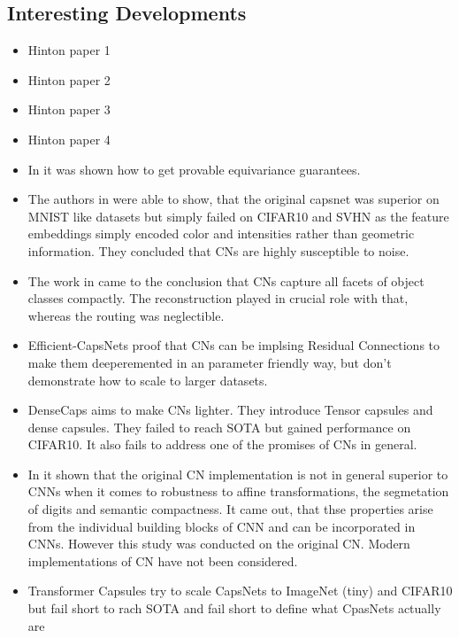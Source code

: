 \documentclass{article}
\begin{document}
\subsection{Interesting Developments}
\begin{itemize}
	\item \cite{icann/HintonKW11} Hinton paper 1
	\item \cite{nips/SabourFH17} Hinton paper 2
	\item \cite{iclr/HintonSF18} Hinton paper 3
	\item \cite{nips/KosiorekSTH19} Hinton paper 4
	\item In \cite{DBLP:conf/iclr/VenkataramanBS20} it was shown how to get provable equivariance guarantees.
	\item The authors in \cite{DBLP:journals/corr/Nair2021} were able to show, that the original capsnet \cite{DBLP:conf/nips/SabourFH17} was superior on MNIST like datasets but simply failed on CIFAR10 and SVHN as the feature embeddings simply encoded color and intensities rather than geometric information. They concluded that CNs are highly susceptible to noise.
	\item The work in \cite{DBLP:journals/corr/Arjun2020} came to the conclusion that CNs capture all facets of object classes compactly. The reconstruction played in crucial role with that, whereas the routing was neglectible.
	\item Efficient-CapsNets \cite{DBLP:journals/corr/Mazzia2021} proof that CNs can be implsing Residual Connections to make them deeperemented in an parameter friendly way, but don't demonstrate how to scale to larger datasets.
	\item DenseCaps \cite{DBLP:journals/soco/SunWYX21} aims to make CNs lighter. They introduce Tensor capsules and dense capsules. They failed to reach SOTA but gained performance on CIFAR10. It also fails to address one of the promises of CNs in general.
	\item In \cite{DBLP:conf/cvpr/GuT021} it shown that the original CN implementation is not in general superior to CNNs when it comes to robustness to affine transformations, the segmetation of digits and semantic compactness. It came out, that thse properties arise from the individual building blocks of CNN and can be incorporated in CNNs. However this study was conducted on the original CN. Modern implementations of CN have not been considered.
	\item Transformer Capsules \cite{mobiny2021transcaps} try to scale CapsNets to ImageNet (tiny) and CIFAR10 but fail short to rach SOTA and fail short to define what CpasNets actually are

\end{itemize}
\end{document}
